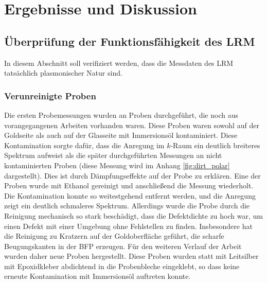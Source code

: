 \documentclass[titlepage,  ngerman]{article}
\begin{document}
	\section{Ergebnisse und Diskussion}
	
	\subsection{Überprüfung der Funktionsfähigkeit des LRM}
	In diesem Abschnitt soll verifiziert werden, dass die Messdaten des LRM tatsächlich plasmonischer Natur sind.
	\subsubsection{Verunreinigte Proben}
	Die ersten Probemessungen wurden an Proben durchgeführt, die noch aus vorangegangenen Arbeiten vorhanden waren. Diese Proben waren sowohl auf der Goldseite als auch auf der Glasseite mit Immersionsöl kontaminiert. Diese Kontamination sorgte dafür, dass die Anregung im $k$-Raum ein deutlich breiteres Spektrum aufweist als die später durchgeführten Messungen an nicht kontaminierten Proben (diese Messung wird im Anhang \ref{fig:dirt_polar} dargestellt). Dies ist durch Dämpfungseffekte auf der Probe zu erklären. Eine der Proben wurde mit Ethanol gereinigt und anschließend die Messung wiederholt. Die Kontamination konnte so weitestgehend entfernt werden, und die Anregung zeigt ein deutlich schmaleres Spektrum. Allerdings wurde die Probe durch die Reinigung mechanisch so stark beschädigt, dass die Defektdichte zu hoch war, um einen Defekt mit einer Umgebung ohne Fehlstellen zu finden. Insbesondere hat die Reinigung zu Kratzern auf der Goldoberfläche geführt, die scharfe Beugungskanten in der BFP  erzeugen. Für den weiteren Verlauf der Arbeit wurden daher neue Proben hergestellt. Diese Proben wurden statt mit Leitsilber mit Epoxidkleber abdichtend in die Probenbleche eingeklebt, so dass keine erneute Kontamination mit Immersionsöl auftreten konnte.
\end{document}
